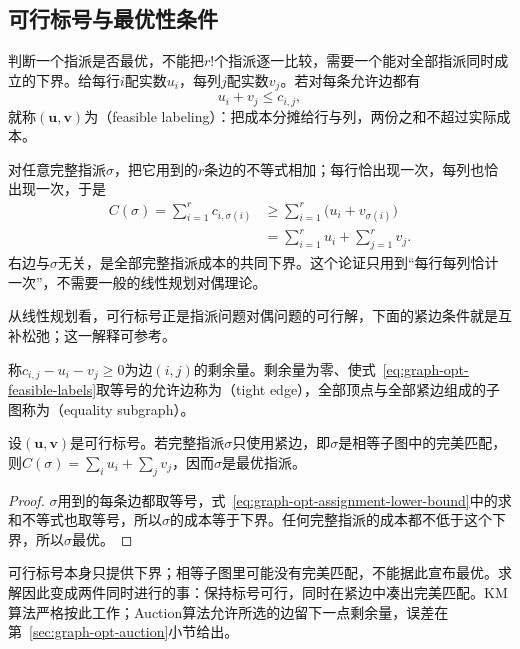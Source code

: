 \subsection{可行标号与最优性条件}
\label{sec:graph-opt-assign-labels}

判断一个指派是否最优，不能把$r!$个指派逐一比较，需要一个能对全部指派同时成立的下界。给每行$i$配实数$u_i$，每列$j$配实数$v_j$。若对每条允许边都有
\begin{equation}
  u_i+v_j\leq c_{i,j},
  \label{eq:graph-opt-feasible-labels}
\end{equation}
就称$(\bm u,\bm v)$为（feasible labeling）：把成本分摊给行与列，两份之和不超过实际成本。

对任意完整指派$\sigma$，把它用到的$r$条边的不等式相加；每行恰出现一次，每列也恰出现一次，于是
\begin{equation}
  \begin{aligned}
    C(\sigma)=\sum_{i=1}^r c_{i,\sigma(i)}
    &\geq\sum_{i=1}^r\bigl(u_i+v_{\sigma(i)}\bigr)\\
    &=\sum_{i=1}^r u_i+\sum_{j=1}^r v_j.
  \end{aligned}
  \label{eq:graph-opt-assignment-lower-bound}
\end{equation}
右边与$\sigma$无关，是全部完整指派成本的共同下界。这个论证只用到“每行每列恰计一次”，不需要一般的线性规划对偶理论。

从线性规划看，可行标号正是指派问题对偶问题的可行解，下面的紧边条件就是互补松弛；这一解释可参考。

称$c_{i,j}-u_i-v_j\geq0$为边$(i,j)$的剩余量。剩余量为零、使式~\eqref{eq:graph-opt-feasible-labels}取等号的允许边称为（tight edge），全部顶点与全部紧边组成的子图称为（equality subgraph）。
\begin{theorem}[紧边指派的最优性]
\label{thm:graph-opt-tight-assignment}
设$(\bm u,\bm v)$是可行标号。若完整指派$\sigma$只使用紧边，即$\sigma$是相等子图中的完美匹配，则$C(\sigma)=\sum_iu_i+\sum_jv_j$，因而$\sigma$是最优指派。
\end{theorem}

\begin{proof}
$\sigma$用到的每条边都取等号，式~\eqref{eq:graph-opt-assignment-lower-bound}中的求和不等式也取等号，所以$\sigma$的成本等于下界。任何完整指派的成本都不低于这个下界，所以$\sigma$最优。
\end{proof}

可行标号本身只提供下界；相等子图里可能没有完美匹配，不能据此宣布最优。求解因此变成两件同时进行的事：保持标号可行，同时在紧边中凑出完美匹配。KM算法严格按此工作；Auction算法允许所选的边留下一点剩余量，误差在第~\ref{sec:graph-opt-auction}小节给出。

